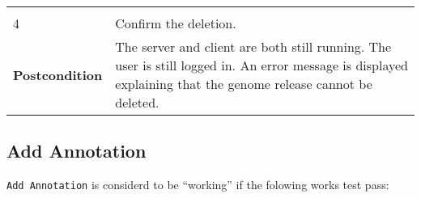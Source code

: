 \begin{longtable}[c]{@{}ll@{}}
\begin{minipage}[t]{0.63\columnwidth}
\strut\end{minipage}\tabularnewline
\begin{minipage}[t]{0.31\columnwidth}\raggedright\strut
4
\strut\end{minipage} &
\begin{minipage}[t]{0.63\columnwidth}\raggedright\strut
Confirm the deletion.
\strut\end{minipage}\tabularnewline
\begin{minipage}[t]{0.31\columnwidth}\raggedright\strut
\textbf{Postcondition}
\strut\end{minipage} &
\begin{minipage}[t]{0.63\columnwidth}\raggedright\strut
The server and client are both still running. The user is still logged
in. An error message is displayed explaining that the genome release
cannot be deleted.
\strut\end{minipage}\tabularnewline
\bottomrule
\end{longtable}

\pagebreak

\subsection{Add Annotation}\label{add-annotation}

\texttt{Add\ Annotation} is considerd to be ``working'' if the folowing
works test pass:

